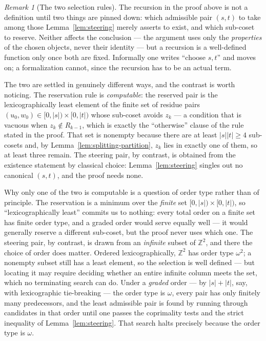 \documentclass[a4paper,11pt,oneside,reqno]{amsart}
\theoremstyle{definition}
\theoremstyle{remark}
\newtheorem{remark}[definition]{Remark}
\theoremstyle{plain}
\newcommand{\Z}{\mathbb{Z}}
\begin{document}
\begin{remark}[The two selection rules]
  \label{rem:choices}
  The recursion in the proof above is not a definition until two things are pinned down: which
  admissible pair \((s,t)\) to take among those Lemma~\ref{lem:steering} merely asserts to exist,
  and which sub-coset to reserve. Neither affects the conclusion --- the argument uses only the
  \emph{properties} of the chosen objects, never their identity --- but a recursion is a
  well-defined function only once both are fixed. Informally one writes ``choose \(s,t\)'' and moves
  on; a formalization cannot, since the recursion has to be an actual term.

  The two are settled in genuinely different ways, and the contrast is worth noticing. The
  reservation rule is \emph{computable}: the reserved pair is the lexicographically least element of
  the finite set of residue pairs \((u_0,w_0)\in[0,|s|)\times[0,|t|)\) whose sub-coset avoids
  \(z_k\) --- a condition that is vacuous when \(z_k\notin R_{k-1}\), which is exactly the
  ``otherwise'' clause of the rule stated in the proof. That set is nonempty because there are at
  least \(|s||t|\ge4\) sub-cosets and, by Lemma~\ref{lem:splitting-partition}, \(z_k\) lies in
  exactly one of them, so at least three remain. The steering pair, by contrast, is obtained from
  the existence statement by classical choice: Lemma~\ref{lem:steering} singles out no canonical
  \((s,t)\), and the proof needs none.

  Why only one of the two is computable is a question of order type rather than of principle. The
  reservation is a minimum over the \emph{finite} set \([0,|s|)\times[0,|t|)\), so
  ``lexicographically least'' commits us to nothing: every total order on a finite set has finite
  order type, and a graded order would serve equally well --- it would generally reserve a different
  sub-coset, but the proof never uses which one. The steering pair, by contrast, is drawn from an
  \emph{infinite} subset of \(\Z^2\), and there the choice of order does matter. Ordered
  lexicographically, \(\Z^2\) has order type \(\omega^2\); a nonempty subset still has a least
  element, so the selection is well defined --- but locating it may require deciding whether an
  entire infinite column meets the set, which no terminating search can do. Under a \emph{graded}
  order --- by \(|s|+|t|\), say, with lexicographic tie-breaking --- the order type is \(\omega\),
  every pair has only finitely many predecessors, and the least admissible pair is found by running
  through candidates in that order until one passes the coprimality tests and the strict inequality
  of Lemma~\ref{lem:steering}. That search halts precisely because the order type is \(\omega\).


\end{remark}
\end{document}
